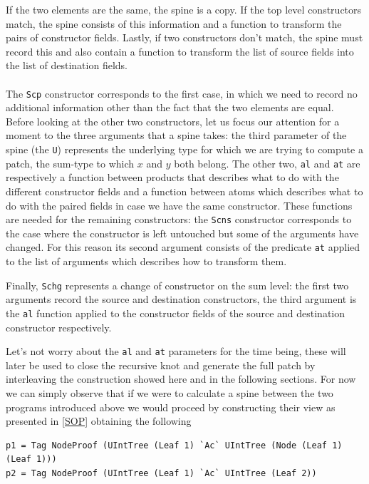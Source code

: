 \documentclass[11pt, titlepage]{article}
\begin{document}
If the two
elements are the same, the spine is a copy. If the top level
constructors match, the spine consists of this information and a function to
transform the pairs of constructor fields. Lastly, if two constructors
don't match, the spine must record this and also contain a function to
transform the list of source fields into the list of destination fields.
\\\\
The \texttt{Scp} constructor corresponds to the first case, in which we need
to record no additional information other than the fact that the two
elements are equal. 
Before looking at the other two constructors, let us focus our attention for a moment to the three arguments that a spine takes:
the third parameter of the spine (the \texttt{U}) represents the
underlying type for which we are trying to compute a patch, the sum-type to which $x$ and $y$ both belong.
The other two, \texttt{al} and \texttt{at} are respectively a
function between products that describes what to do with the different
constructor fields and a function between atoms which describes what to
do with the paired fields in case we have the same constructor.
These functions are needed for the remaining constructors: the \texttt{Scns} constructor corresponds to the 
case where the constructor is left untouched but some of the arguments have changed.
For this reason its second argument consists of the predicate \texttt{at} applied to the list of arguments which describes
how to transform them. 

Finally, \texttt{Schg} represents a change of constructor on the sum level: the first two arguments record the
source and destination constructors, the third argument is the
\texttt{al} function applied to the constructor fields of the source and
destination constructor respectively.

Let's not worry about the \texttt{al} and \texttt{at} parameters for the time 
being, these will later be used to close the recursive knot and generate the full patch by interleaving
the construction showed here and in the following sections. 
For now we can simply observe that if we were to calculate a spine between the 
two programs introduced above we would proceed by constructing their view as 
presented in \ref{SOP} obtaining the following

\begin{verbatim}
p1 = Tag NodeProof (UIntTree (Leaf 1) `Ac` UIntTree (Node (Leaf 1) (Leaf 1)))
p2 = Tag NodeProof (UIntTree (Leaf 1) `Ac` UIntTree (Leaf 2))
\end{verbatim}
\end{document}
